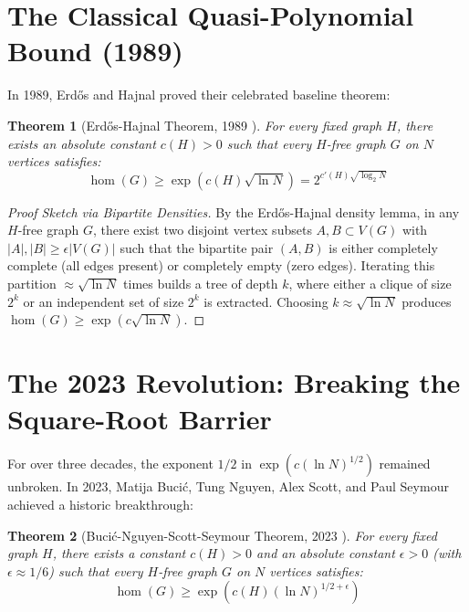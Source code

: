 \documentclass[11pt,a4paper]{article}
\newtheorem{theorem}{Theorem}[section]
\theoremstyle{definition}
\begin{document}
\section{The Classical Quasi-Polynomial Bound (1989)}

In 1989, Erd\H{o}s and Hajnal proved their celebrated baseline theorem:

\begin{theorem}[Erd\H{o}s-Hajnal Theorem, 1989 \cite{erdos1989}]\label{thm:eh_classical}
For every fixed graph $H$, there exists an absolute constant $c(H) > 0$ such that every $H$-free graph $G$ on $N$ vertices satisfies:
\begin{equation}\label{eq:eh_quasi}
\operatorname{hom}(G) \ge \exp\left( c(H) \sqrt{\ln N} \right) = 2^{c'(H) \sqrt{\log_2 N}}
\end{equation}
\end{theorem}

\begin{proof}[Proof Sketch via Bipartite Densities]
By the Erd\H{o}s-Hajnal density lemma, in any $H$-free graph $G$, there exist two disjoint vertex subsets $A, B \subset V(G)$ with $|A|, |B| \ge \epsilon |V(G)|$ such that the bipartite pair $(A, B)$ is either completely complete (all edges present) or completely empty (zero edges).
Iterating this partition $\approx \sqrt{\ln N}$ times builds a tree of depth $k$, where either a clique of size $2^k$ or an independent set of size $2^k$ is extracted.
Choosing $k \approx \sqrt{\ln N}$ produces $\operatorname{hom}(G) \ge \exp(c \sqrt{\ln N})$.
\end{proof}

\section{The 2023 Revolution: Breaking the Square-Root Barrier}

For over three decades, the exponent $1/2$ in $\exp(c (\ln N)^{1/2})$ remained unbroken.
In 2023, Matija Buci\'c, Tung Nguyen, Alex Scott, and Paul Seymour \cite{bucic2023} achieved a historic breakthrough:

\begin{theorem}[Buci\'c-Nguyen-Scott-Seymour Theorem, 2023 \cite{bucic2023}]\label{thm:bnss}
For every fixed graph $H$, there exists a constant $c(H) > 0$ and an absolute constant $\epsilon > 0$ (with $\epsilon \approx 1/6$) such that every $H$-free graph $G$ on $N$ vertices satisfies:
\begin{equation}\label{eq:bnss_bound}
\operatorname{hom}(G) \ge \exp\left( c(H) (\ln N)^{1/2 + \epsilon} \right)
\end{equation}
\end{theorem}
\end{document}
